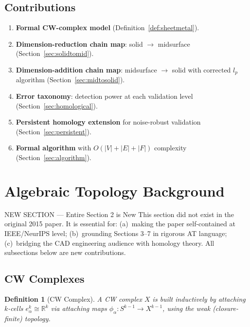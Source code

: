 \documentclass[journal,twocolumn,10pt]{IEEEtran}
\newtheorem{definition}[theorem]{Definition}
\begin{document}
\subsection*{Contributions}
\begin{enumerate}[noitemsep,topsep=2pt]
\item \textbf{Formal CW-complex model} (Definition~\ref{def:sheetmetal}).
\item \textbf{Dimension-reduction chain map}: solid $\to$ midsurface
      (Section~\ref{sec:solidtomid}).
\item \textbf{Dimension-addition chain map}: midsurface $\to$ solid with
      corrected $l_p$ algorithm (Section~\ref{sec:midtosolid}).
\item \textbf{Error taxonomy}: detection power at each validation level
      (Section~\ref{sec:homological}).
\item \textbf{Persistent homology extension} for noise-robust validation
      (Section~\ref{sec:persistent}).
\item \textbf{Formal algorithm} with $O(|V|+|E|+|F|)$ complexity
      (Section~\ref{sec:algorithm}).
\end{enumerate}

\section{Algebraic Topology Background}\label{sec:at_background}

\begin{addblock}{NEW SECTION --- Entire Section 2 is New}
This section did not exist in the original 2015 paper. It is essential for:
(a)~making the paper self-contained at IEEE/NeurIPS level;
(b)~grounding Sections 3--7 in rigorous AT language;
(c)~bridging the CAD engineering audience with homology theory.
All subsections below are new contributions.
\end{addblock}

\subsection{CW Complexes}

\begin{definition}[CW Complex]
A \emph{CW complex} $X$ is built inductively by attaching $k$-cells
$e^k_\alpha\cong\mathbb{R}^k$ via attaching maps $\phi_\alpha:S^{k-1}\to
X^{k-1}$, using the weak (closure-finite) topology.
\end{definition}
\end{document}

